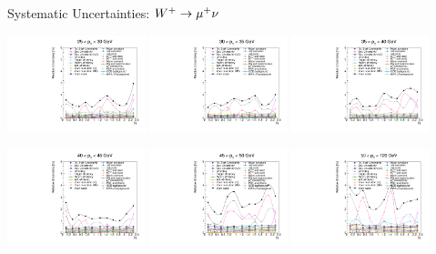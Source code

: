 \begin{frame}{Systematic Uncertainties: $W^+ \rightarrow \mu^+ \nu$}
 \begin{center}
   \includegraphics[width=0.3\textwidth]{dates/20121219/figures/xsec/POS/Wmn_Unc_2d_Slice_2.pdf}
   \includegraphics[width=0.3\textwidth]{dates/20121219/figures/xsec/POS/Wmn_Unc_2d_Slice_3.pdf}
   \includegraphics[width=0.3\textwidth]{dates/20121219/figures/xsec/POS/Wmn_Unc_2d_Slice_4.pdf}
 \end{center}
 \begin{center}
   \includegraphics[width=0.3\textwidth]{dates/20121219/figures/xsec/POS/Wmn_Unc_2d_Slice_5.pdf}
   \includegraphics[width=0.3\textwidth]{dates/20121219/figures/xsec/POS/Wmn_Unc_2d_Slice_6.pdf}
   \includegraphics[width=0.3\textwidth]{dates/20121219/figures/xsec/POS/Wmn_Unc_2d_Slice_7.pdf}
 \end{center}
\end{frame}




